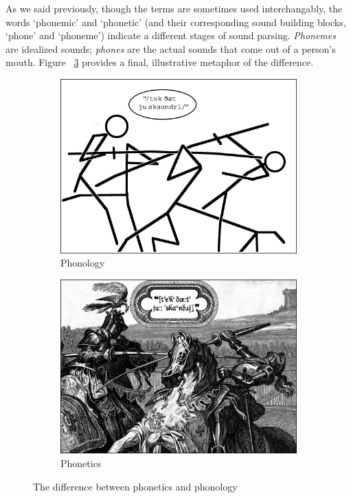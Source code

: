 As we said previously, though the terms are sometimes used interchangably, the words `phonemic' and `phonetic' (and their corresponding sound building blocks, `phone' and `phoneme')  indicate a different stages of sound parsing.  \emph{Phonemes} are idealized sounds; \emph{phones} are the actual sounds that come out of a person's mouth.  Figure ~\ref{fig:knightsPhoneticPhonemic} provides a final, illustrative metaphor of the difference.
\begin{figure}[b]
\centering
        \begin{subfigure}[b]{0.4\textwidth}
                \centering
                \includegraphics[width=\textwidth]{knights_phonemic.jpg}
                \captionfonts
                \caption[Phonemic Knights]{Phonology\cite{cartoonPhonemic} }
                \label{fig:cartoonPhonemic}
        \end{subfigure}
        \quad
        \begin{subfigure}[b]{0.4\textwidth}
                \centering
                \includegraphics[width=\textwidth]{knights_phonetic.jpg}
                \captionfonts
                \caption[Phonetic Knights]{Phonetics\cite{cartoonPhonetic} }
                \label{fig:cartoonPhonetic}
        \end{subfigure}
\caption{The difference between phonetics and phonology}\label{fig:knightsPhoneticPhonemic}
\end{figure}
